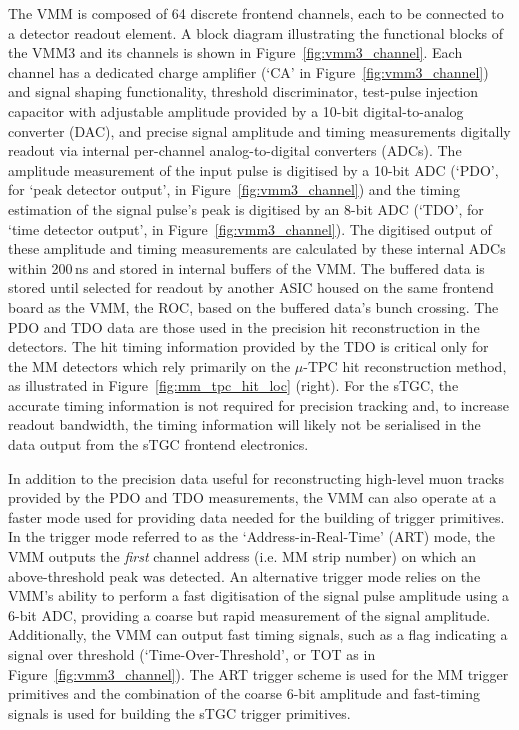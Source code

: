 The VMM is composed of 64 discrete frontend channels, each to be connected to a detector
readout element.
A block diagram illustrating the functional blocks of the VMM3 and its channels is
shown in Figure~\ref{fig:vmm3_channel}.
Each channel has a dedicated charge amplifier (`CA' in Figure~\ref{fig:vmm3_channel}) and signal
shaping functionality,
threshold discriminator, test-pulse injection capacitor with adjustable amplitude provided
by a 10-bit digital-to-analog converter (DAC), and precise signal amplitude and timing measurements digitally readout via
internal per-channel analog-to-digital converters (ADCs).
The amplitude measurement of the input pulse is digitised by a 10-bit ADC (`PDO', for `peak detector output', in Figure~\ref{fig:vmm3_channel})
and the timing estimation of the signal pulse's peak is digitised by an 8-bit ADC (`TDO', for `time detector output', in Figure~\ref{fig:vmm3_channel}).
The digitised output of these amplitude and timing measurements are calculated by these
internal ADCs within 200\,ns and stored in internal buffers of the VMM.
The buffered data is stored until selected for readout by another ASIC housed on the same frontend
board as the VMM, the ROC, based on the buffered data's bunch crossing.
The PDO and TDO data are those used in the precision hit reconstruction in the detectors.
The hit timing information provided by the TDO is critical only for the MM detectors which
rely primarily on the $\mu$-TPC hit reconstruction method, as illustrated in Figure~\ref{fig:mm_tpc_hit_loc} (right).
For the sTGC, the accurate timing information is not required for precision tracking and,
to increase readout bandwidth, the timing information will likely not be serialised
in the data output from the sTGC frontend electronics.

In addition to the precision data useful for reconstructing high-level muon tracks provided by
the PDO and TDO measurements, the VMM can also operate at a faster mode used for
providing data needed for the building of trigger primitives.
In the trigger mode referred to as the `Address-in-Real-Time' (ART) mode,
the VMM outputs the \textit{first} channel address (i.e. MM strip number) on which
an above-threshold peak was detected.
An alternative trigger mode relies on the VMM's ability to perform a fast digitisation of
the signal pulse amplitude using a 6-bit ADC, providing a coarse but rapid measurement
of the signal amplitude.
Additionally, the VMM can output fast timing signals, such as a flag indicating a signal over threshold (`Time-Over-Threshold', or TOT as in Figure~\ref{fig:vmm3_channel}).
The ART trigger scheme is used for the MM trigger primitives and the combination
of the coarse 6-bit amplitude and fast-timing signals is used for building the
sTGC trigger primitives.

